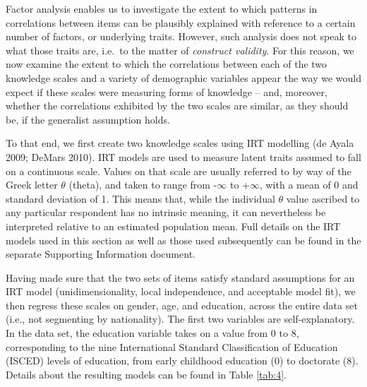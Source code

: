 \documentclass[11pt,halfline,a4paper,]{ouparticle}
\begin{document}
Factor analysis enables us to investigate the extent to which patterns
in correlations between items can be plausibly explained with reference
to a certain number of factors, or underlying traits. However, such
analysis does not speak to what those traits are, i.e.~to the matter of
\emph{construct validity}. For this reason, we now examine the extent to
which the correlations between each of the two knowledge scales and a
variety of demographic variables appear the way we would expect if these
scales were measuring forms of knowledge -- and, moreover, whether the
correlations exhibited by the two scales are similar, as they should be,
if the generalist assumption holds.

To that end, we first create two knowledge scales using IRT modelling
(de Ayala 2009; DeMars 2010). IRT models are used to measure latent
traits assumed to fall on a continuous scale. Values on that scale are
usually referred to by way of the Greek letter \(\theta\) (theta), and
taken to range from -\(\infty\) to +\(\infty\), with a mean of 0 and
standard deviation of 1. This means that, while the individual
\(\theta\) value ascribed to any particular respondent has no intrinsic
meaning, it can nevertheless be interpreted relative to an estimated
population mean. Full details on the IRT models used in this section as
well as those used subsequently can be found in the separate Supporting
Information document.

Having made sure that the two sets of items satisfy standard assumptions
for an IRT model (unidimensionality, local independence, and acceptable
model fit), we then regress these scales on gender, age, and education,
across the entire data set (i.e., not segmenting by nationality). The
first two variables are self-explanatory. In the data set, the education
variable takes on a value from 0 to 8, corresponding to the nine
International Standard Classification of Education (ISCED) levels of
education, from early childhood education (0) to doctorate (8). Details
about the resulting models can be found in Table \ref{tab:4}.
\end{document}
